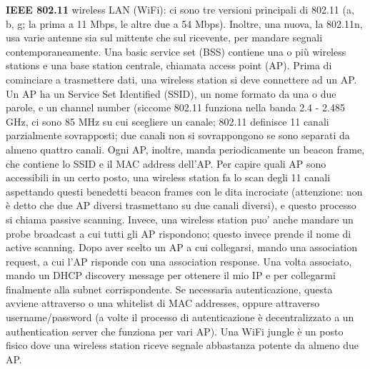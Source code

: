 \documentclass[a4paper,10pt]{article} %
\renewcommand{\b}[1]{%
    {\textbf{#1}}}
\begin{document}
\b{IEEE 802.11} wireless LAN (WiFi): ci sono tre versioni principali di 802.11 (a, b, g; la prima a 11 Mbps, le altre due a 54 Mbps). Inoltre, una nuova, la 802.11n, usa varie antenne sia sul mittente che sul ricevente, per mandare segnali contemporaneamente. Una basic service set (BSS) contiene una o più wireless stations e una base station centrale, chiamata access point (AP). Prima di cominciare a trasmettere dati, una wireless station si deve connettere ad un AP. Un AP ha un Service Set Identified (SSID), un nome formato da una o due parole, e un channel number (siccome 802.11 funziona nella banda 2.4 - 2.485 GHz, ci sono 85 MHz su cui scegliere un canale; 802.11 definisce 11 canali parzialmente sovrapposti; due canali non si sovrappongono se sono separati da almeno quattro canali. Ogni AP, inoltre, manda periodicamente un beacon frame, che contiene lo SSID e il MAC address dell'AP. Per capire quali AP sono accessibili in un certo posto, una wireless station fa lo scan degli 11 canali aspettando questi benedetti beacon frames con le dita incrociate (attenzione: non è detto che due AP diversi trasmettano su due canali diversi), e questo processo si chiama passive scanning. Invece, una wireless station puo' anche mandare un probe broadcast a cui tutti gli AP rispondono; questo invece prende il nome di active scanning. Dopo aver scelto un AP a cui collegarsi, mando una association request, a cui l'AP risponde con una association response. Una volta associato, mando un DHCP discovery message per ottenere il mio IP e per collegarmi finalmente alla subnet corrispondente. Se necessaria autenticazione, questa avviene attraverso o una whitelist di MAC addresses, oppure attraverso username/password (a volte il processo di autenticazione è decentralizzato a un authentication server che funziona per vari AP).  Una WiFi jungle è un posto fisico dove una wireless station riceve segnale abbastanza potente da almeno due AP.
\end{document}
